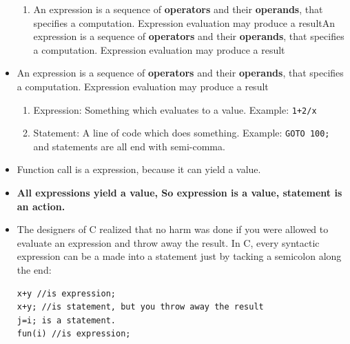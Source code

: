 \documentclass[a4paper,11pt,twoside]{book}
\begin{document}
\begin{itemize}
\begin{enumerate}
	\item An expression is a sequence of \textbf{operators} and their \textbf{operands}, that specifies a computation. Expression evaluation may produce a resultAn expression is a sequence of \textbf{operators} and their \textbf{operands}, that specifies a computation. Expression evaluation may produce a result
\end{enumerate}
	\item An expression is a sequence of \textbf{operators} and their \textbf{operands}, that specifies a computation. Expression evaluation may produce a result

    \begin{enumerate}
    	\item Expression: Something which evaluates to a value. Example: \texttt{1+2/x}
    	\item Statement: A line of code which does something. Example: \texttt{GOTO 100;} and statements are all end with semi-comma.
    \end{enumerate}

    \item Function call is a expression, because it can yield a value.
    
    \item \textbf{All expressions yield a value, So expression is a value, statement is an action.}
    

    \item The designers of C realized that no harm was done if you were allowed to evaluate an expression and throw away the result. In C, every syntactic expression can be a made into a statement just by tacking a semicolon along the end:
    
\begin{lstlisting}[numbers=none]
x+y //is expression;
x+y; //is statement, but you throw away the result
j=i; is a statement.
fun(i) //is expression;
\end{lstlisting}
    
\end{itemize}
\end{document}
